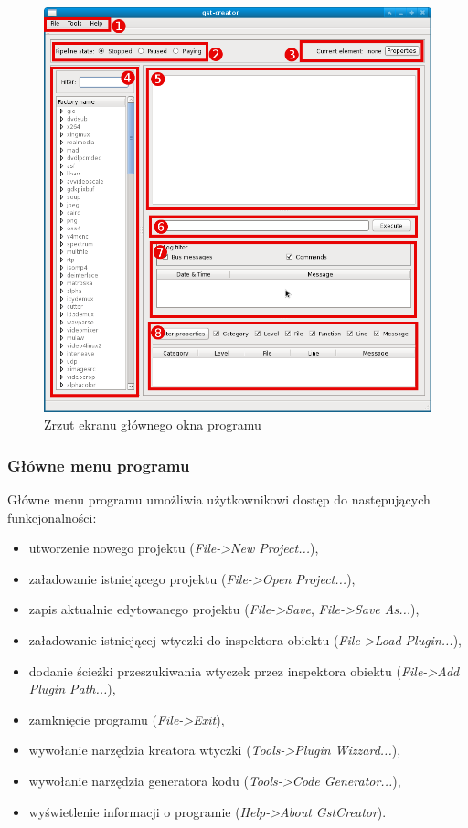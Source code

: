 \documentclass[12pt]{article}
\begin{document}
\begin{figure}[H]
  \includegraphics[width=160mm]{img/main-window.png}
  \caption{Zrzut ekranu głównego okna programu}
  \label{fig:mainWindow}
\end{figure}
\subsubsection{Główne menu programu}
Główne menu programu umożliwia użytkownikowi dostęp do następujących funkcjonalności:
\begin{itemize}
  \setlength{\itemsep}{0em}
\item utworzenie nowego projektu (\textit{File->New Project...}),
\item załadowanie istniejącego projektu (\textit{File->Open Project...}),
\item zapis aktualnie edytowanego projektu (\textit{File->Save}, \textit{File->Save As...}),
\item załadowanie istniejącej wtyczki do inspektora obiektu (\textit{File->Load Plugin...}),
\item dodanie ścieżki przeszukiwania wtyczek przez inspektora obiektu (\textit{File->Add Plugin Path...}),
\item zamknięcie programu (\textit{File->Exit}),
\item wywołanie narzędzia kreatora wtyczki (\textit{Tools->Plugin Wizzard...}),
\item wywołanie narzędzia generatora kodu (\textit{Tools->Code Generator...}),
\item wyświetlenie informacji o programie (\textit{Help->About GstCreator}).
\end{itemize}
\end{document}
